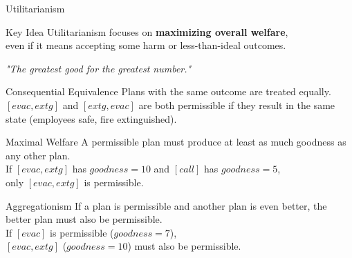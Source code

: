 \documentclass[compress,xcolor=table]{beamer}
\begin{document}
\begin{frame}{Utilitarianism}
    \begin{block}{Key Idea}
        Utilitarianism focuses on \textbf{maximizing overall welfare}, \\
        even if it means accepting some harm or less-than-ideal outcomes. \\
        \begin{center}
            \textit{"The greatest good for the greatest number."}
        \end{center}
    \end{block}
    \tiny
    \begin{block}{Consequential Equivalence}
            Plans with the same outcome are treated equally.\\
            $[evac, extg]$ and $[extg, evac]$ are both permissible if they result in the same state (employees safe, fire extinguished).
    \end{block}

    \begin{block}{Maximal Welfare}
        A permissible plan must produce at least as much goodness as any other plan.\\
        If $[evac, extg]$ has $goodness = 10$ and $[call]$ has $goodness = 5$, \\
        only $[evac, extg]$ is permissible.
    \end{block}

    \begin{block}{Aggregationism}
        If a plan is permissible and another plan is even better, 
        the better plan must also be permissible.\\

        If $[evac]$ is permissible ($goodness = 7$), \\
        $[evac, extg]$ ($goodness = 10$) must also be permissible.
    \end{block}

\end{frame}
\end{document}
